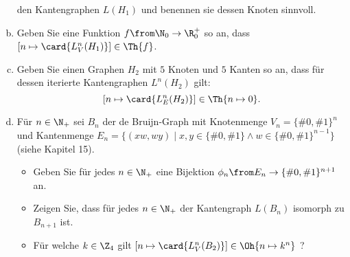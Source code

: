 \documentclass[12pt]{article}
\begin{document}
\begin{aufgabe}[7]
\begin{enumerate}[a)]
    den Kantengraphen $L(H_1)$ und benennen sie dessen Knoten sinnvoll.
  \item Geben Sie eine Funktion $f\from \N_0\to\R_0^+$ so an, dass
    $[n\mapsto \card{L^n_V(H_1)}] \in\Th{f}$.
  \item Geben Sie einen Graphen $H_2$ mit $5$ Knoten und
    $5$ Kanten so an, dass für dessen iterierte Kantengraphen
    $L^n(H_2)$ gilt:
    \[
      [n\mapsto \card{L^n_E(H_2)}]\in \Th{n\mapsto 0} .
    \]
  \item Für $n\in\N_+$ sei $B_n$ der de Bruijn-Graph mit Knotenmenge
    $V_n=\{\#0,\#1\}^n$ und Kantenmenge
    $E_n=\{ (xw,wy) \mid x,y\in\{\#0,\#1\} \land w\in\{\#0,\#1\}^{n-1}\}$
    (siehe Kapitel 15).
    \begin{itemize}
    \item Geben Sie für jedes $n\in\N_+$ eine Bijektion
      $\phi_n\from E_n \to \{\#0,\#1\}^{n+1}$ an.
    \item Zeigen Sie, dass für jedes $n\in\N_+$ der Kantengraph
      $L(B_n)$ isomorph zu $B_{n+1}$ ist.
    \item Für welche $k\in\Z_4$ gilt
      $[n\mapsto \card{L_V^n(B_2)}] \in \Oh{n\mapsto k^n}$ ?
    \end{itemize}
  \end{enumerate}
\end{aufgabe}
\end{document}
